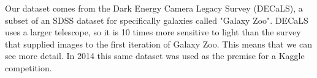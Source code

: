 Our dataset comes from the Dark Energy Camera Legacy Survey (DECaLS), a subset of an SDSS dataset for specifically galaxies called "Galaxy Zoo". DECaLS uses a larger telescope, so it is 10 times more sensitive to light than the survey that supplied images to the first iteration of Galaxy Zoo. This means that we can see more detail. \cite{zooniverse} In 2014 this same dataset was used as the premise for a Kaggle competition.

